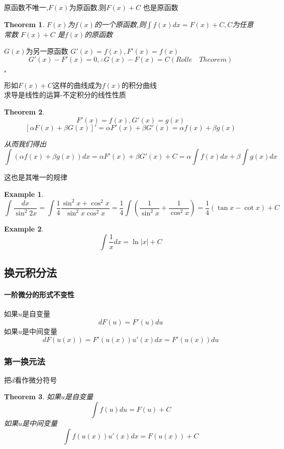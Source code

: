 \documentclass[11pt,hyperref,a4paper,UTF8]{ctexart}
\newtheorem{theorem}{Theorem}[subsection]
\newtheorem{example}{Example}[subsection]
\newenvironment{cproof}{%
\heiti{证明}\kaishu
}{%
  \hfill $\square$
  \par\bigskip
}
\begin{document}
\begin{CJK}{UTF8}{gkai}
原函数不唯一,$F(x)$为原函数,则$F(x) + C$ 也是原函数

\begin{theorem}
  $F(x)$为$f(x)$的一个原函数,则$\int f(x) dx = F(x) + C,C$为任意常数
  $F(x) + C$ 是$f(x)$的原函数
\end{theorem}

\begin{cproof}
$G(x)$为另一原函数 $G'(x) = f(x), F'(x) = f(x)$\\
\[G'(x) - F'(x) = 0 ,\therefore G(x) - F(x) = C (Rolle \quad Theorem) \]

\end{cproof}
形如$F(x) + C$这样的曲线成为$f(x)$的积分曲线\\

求导是线性的运算-不定积分的线性性质\\
\begin{theorem}
  \[F'(x) = f(x) ,G'(x) = g(x)\]
  \[[\alpha F(x) + \beta G(x)]'  = \alpha F'(x) + \beta G'(x) = \alpha f(x) + \beta g(x)\]

  从而我们得出
  \[\int(\alpha f(x) + \beta g(x))dx = \alpha F'(x) + \beta G'(x) + C = \alpha \int f(x)dx + \beta \int g(x)dx\]
\end{theorem}
这也是其唯一的规律\\

\begin{example}
  \[\int \dfrac{dx}{\sin^2 2x} = \int\frac{1}{4}\dfrac{\sin^2 x+\cos^2 x}{\sin^2 x \cos^2 x} = \frac{1}{4}\int (\dfrac{1}{\sin^2 x} + \dfrac{1}{\cos^2 x} ) = \frac{1}{4}(\tan x - \cot x) + C \]
\end{example}

\begin{example}
  \[\int \frac{1}{x}dx = \ln|x| + C\]
\end{example}


\subsection{换元积分法}
\paragraph{一阶微分的形式不变性}
如果$u$是自变量
\[dF(u) =  F'(u)du\]
如果$u$是中间变量
\[dF(u(x)) = F'(u(x)) u'(x)dx = F'(u(x))du\]

\subsubsection{第一换元法}
把$d$看作微分符号\\
\begin{theorem}
  如果$u$是自变量
  \[\int f(u)du = F(u) + C\]
  如果$u$是中间变量
  \[ \int f(u(x)) u'(x)dx = F(u(x))  + C\]
\end{theorem}


\end{CJK}
\end{document}
